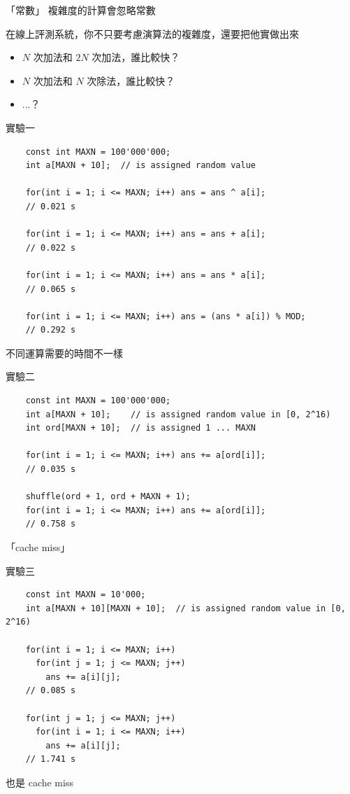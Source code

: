 \documentclass[aspectratio=169]{beamer}
\begin{document}
\begin{frame}{「常數」}
  複雜度的計算會忽略常數

  在線上評測系統，你不只要考慮演算法的複雜度，還要把他實做出來

  \begin{itemize}
    \item $N$ 次加法和 $2N$ 次加法，誰比較快？
    \item $N$ 次加法和 $N$ 次除法，誰比較快？
    \item ...？
  \end{itemize}
\end{frame}

\begin{frame}[fragile]{實驗一}
  \begin{verbatim}
    const int MAXN = 100'000'000;
    int a[MAXN + 10];  // is assigned random value

    for(int i = 1; i <= MAXN; i++) ans = ans ^ a[i];
    // 0.021 s

    for(int i = 1; i <= MAXN; i++) ans = ans + a[i];
    // 0.022 s
    
    for(int i = 1; i <= MAXN; i++) ans = ans * a[i];
    // 0.065 s
    
    for(int i = 1; i <= MAXN; i++) ans = (ans * a[i]) % MOD;
    // 0.292 s
  \end{verbatim}

  不同運算需要的時間不一樣
\end{frame}

\begin{frame}[fragile]{實驗二}
  \begin{verbatim}
    const int MAXN = 100'000'000;
    int a[MAXN + 10];    // is assigned random value in [0, 2^16)
    int ord[MAXN + 10];  // is assigned 1 ... MAXN

    for(int i = 1; i <= MAXN; i++) ans += a[ord[i]];
    // 0.035 s
    
    shuffle(ord + 1, ord + MAXN + 1);
    for(int i = 1; i <= MAXN; i++) ans += a[ord[i]];
    // 0.758 s
  \end{verbatim}

  「cache miss」
\end{frame}

\begin{frame}[fragile]{實驗三}
  \begin{verbatim}
    const int MAXN = 10'000;
    int a[MAXN + 10][MAXN + 10];  // is assigned random value in [0, 2^16)

    for(int i = 1; i <= MAXN; i++)
      for(int j = 1; j <= MAXN; j++)
        ans += a[i][j];
    // 0.085 s
    
    for(int j = 1; j <= MAXN; j++)
      for(int i = 1; i <= MAXN; i++)
        ans += a[i][j];
    // 1.741 s
  \end{verbatim}

  也是 cache miss
\end{frame}
\end{document}
